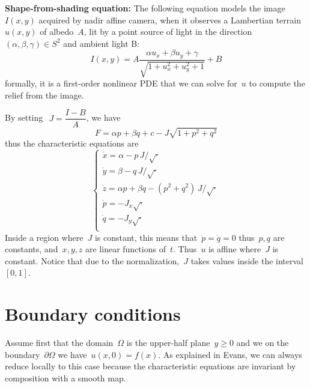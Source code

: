 {\bf Shape-from-shading equation:}
The following equation models the image~$I(x,y)$ acquired by nadir affine
camera, when it observes a Lambertian terrain~$u(x,y)$ of albedo~$A$, lit by
a point source of light in the direction~$\left(\alpha,\beta,\gamma\right)\in
S^2$ and ambient light B:
\[
	I(x,y)=A\frac{\alpha u_x+\beta u_y+\gamma}{\sqrt{1+u_x^2+u_y^2+1}}+B
\]
formally, it is a first-order nonlinear PDE that we can solve for~$u$ to
compute the relief from the image.

By setting~$ \ J=\dfrac{I-B}A$, we have
\[
	F = \alpha p + \beta q + c - J\sqrt{1+p^2+q^2}
\]
thus the characteristic equations are
\[
	\begin{cases}
		\dot x = \alpha - p\,J/\sqrt{\cdot} \\
		\dot y = \beta - q\,J/\sqrt{\cdot} \\
		\dot z = \alpha p + \beta q - (p^2+q^2)\,J/\sqrt{\cdot}\\
		\dot p = -J_x\sqrt{\cdot} \\
		\dot q = -J_y\sqrt{\cdot} \\
	\end{cases}
\]
Inside a region where~$J$ is constant, this means that~$\dot p=\dot q=0$
thus~$p,q$ are constants, and~$x,y,z$ are linear functions of~$t$.
Thus~$u$ is affine where~$J$ is constant.
Notice that due to the normalization,~$J$ takes values inside the
interval~$[0,1]$.


\clearpage
\section{Boundary conditions}

Assume first that the domain~$\Omega$ is the upper-half plane~$y\ge 0$ and we
on the boundary~$\partial\Omega$ we have~$u(x,0)=f(x)$.
As explained in Evans, we can always reduce locally  to this case because the
characteristic equations are invariant by composition with a smooth map.

